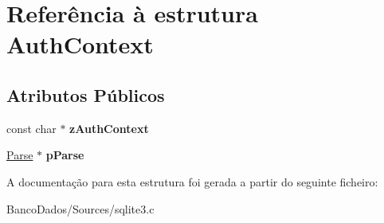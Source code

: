 \hypertarget{struct_auth_context}{\section{Referência à estrutura Auth\-Context}
\label{struct_auth_context}
}
\subsection*{Atributos Públicos}
\begin{DoxyCompactItemize}
\item 
\hypertarget{struct_auth_context_a1b095b152b72326476ac3f7edcaee78a}{const char $\ast$ {\bfseries z\-Auth\-Context}}\label{struct_auth_context_a1b095b152b72326476ac3f7edcaee78a}

\item 
\hypertarget{struct_auth_context_a8df2931d8f4facf59073c92315b00bfa}{\hyperlink{struct_parse}{Parse} $\ast$ {\bfseries p\-Parse}}\label{struct_auth_context_a8df2931d8f4facf59073c92315b00bfa}

\end{DoxyCompactItemize}


A documentação para esta estrutura foi gerada a partir do seguinte ficheiro\-:\begin{DoxyCompactItemize}
\item 
Banco\-Dados/\-Sources/sqlite3.\-c\end{DoxyCompactItemize}
